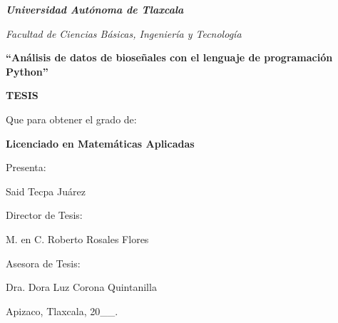 \documentclass[12pt,letterpaper]{report}
\theoremstyle{plain}
\begin{document}
 \pagestyle{empty}
 \BgThispage%
 \LARGE

 \hspace{2.8cm}
\begin{minipage}[l]{15cm}
\begin{center}
\textbf{\textit{\textcolor[rgb]{0.30,0.04,0.04}{Universidad Autónoma de Tlaxcala}}}
\end{center}

 \Large
\begin{center}
\emph{\textcolor[rgb]{0.43,0.00,0.00}{Facultad de Ciencias  Básicas, Ingeniería y Tecnología}}
\end{center}
\vspace{2cm}
\begin{center}
\textbf{ ``Análisis de datos de bioseñales con el lenguaje de programación Python'' }
\end{center}
\vspace{1.2cm}

\begin{center}
\textbf{TESIS}

 \vspace{1.2cm}

Que para obtener el grado de:

 \textbf{Licenciado en Matemáticas Aplicadas}

\vspace{1.2cm}

 Presenta:

Said Tecpa Juárez
\end{center}
\vspace{.5cm}

\begin{center}
Director de Tesis:

M. en C. Roberto Rosales Flores
\end{center}


\begin{center}
Asesora de Tesis:

Dra. Dora Luz Corona Quintanilla
\end{center}

\end{minipage}

\vfill{
\begin{flushright}
\normalsize
Apizaco, Tlaxcala,   20\_\_.
\end{flushright}
}
\end{document}
